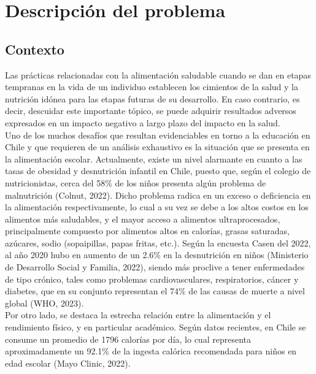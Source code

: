\documentclass[letterpaper]{article}
\begin{document}
\newpage


\tableofcontents
\newpage
\section{Descripción del problema}
    \subsection{Contexto}
    Las prácticas relacionadas con la alimentación saludable cuando se dan en etapas tempranas en la vida de un individuo establecen los cimientos de la salud y la nutrición idónea para las etapas futuras de su desarrollo. En caso contrario, es decir, descuidar este importante tópico, se puede adquirir resultados adversos expresados en un impacto negativo a largo plazo del impacto en la salud.
\\

Uno de los muchos desafíos que resultan evidenciables en torno a la educación en Chile y que requieren de un análisis exhaustivo es la situación que se presenta en la alimentación escolar. Actualmente, existe un nivel alarmante en cuanto a las tasas de obesidad y desnutrición infantil en Chile, puesto que, según el colegio de nutricionistas, cerca del 58\% de los niños presenta algún problema de malnutrición (Colnut, 2022). Dicho problema radica en un exceso o deficiencia en la alimentación respectivamente, lo cual a su vez se debe a los altos costos en los alimentos más saludables, y el mayor acceso a alimentos ultraprocesados, principalmente compuesto por alimentos altos en calorías, grasas saturadas, azúcares, sodio (sopaipillas, papas fritas, etc.). Según la encuesta Casen del 2022, al año 2020 hubo en aumento de un 2.6\% en la desnutrición en niños (Ministerio de Desarrollo Social y Familia, 2022), siendo más proclive a tener enfermedades de tipo crónico, tales como problemas cardiovasculares, respiratorios, cáncer y diabetes, que en su conjunto representan el 74\% de las causas de muerte a nivel global (WHO, 2023).  
\\

Por otro lado, se destaca la estrecha relación entre la alimentación y el rendimiento físico, y en particular académico. Según datos recientes, en Chile se consume un promedio de 1796 calorías por día, lo cual representa aproximadamente un 92.1\% de la ingesta calórica recomendada para niños en edad escolar (Mayo Clinic, 2022).  
\\
\end{document}
